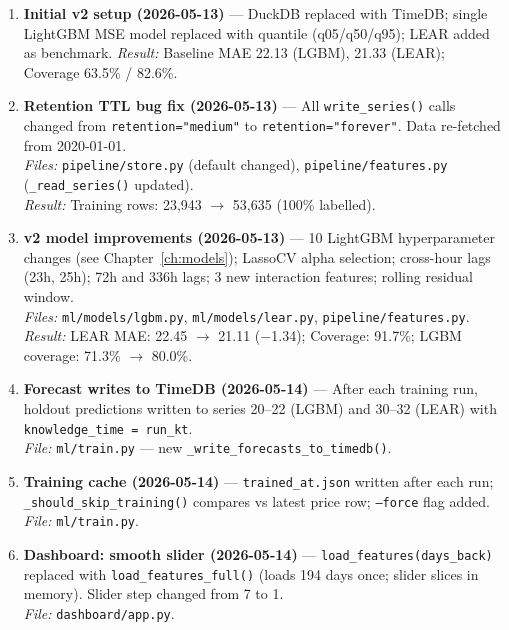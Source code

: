 \documentclass[12pt, a4paper, oneside]{memoir}
\newcommand{\code}[1]{\texttt{\footnotesize #1}}
\newcommand{\filepath}[1]{\textcolor{se3blue}{\texttt{\footnotesize #1}}}
\begin{document}
\begin{enumerate}[leftmargin=*, label=\textbf{Change \arabic*.}]

\item \textbf{Initial v2 setup (2026-05-13)} --- DuckDB replaced with TimeDB; single
  LightGBM MSE model replaced with quantile (q05/q50/q95); LEAR added as benchmark.
  \textit{Result:} Baseline MAE 22.13 (LGBM), 21.33 (LEAR); Coverage 63.5\% / 82.6\%.

\item \textbf{Retention TTL bug fix (2026-05-13)} --- All \code{write\_series()} calls
  changed from \code{retention="medium"} to \code{retention="forever"}. Data re-fetched
  from 2020-01-01.\\
  \textit{Files:} \filepath{pipeline/store.py} (default changed), \filepath{pipeline/features.py}
  (\code{\_read\_series()} updated).\\
  \textit{Result:} Training rows: 23,943 $\rightarrow$ 53,635 (100\% labelled).

\item \textbf{v2 model improvements (2026-05-13)} --- 10 LightGBM hyperparameter
  changes (see Chapter~\ref{ch:models}); LassoCV alpha selection; cross-hour lags
  (23h, 25h); 72h and 336h lags; 3 new interaction features; rolling residual window.\\
  \textit{Files:} \filepath{ml/models/lgbm.py}, \filepath{ml/models/lear.py},
  \filepath{pipeline/features.py}.\\
  \textit{Result:} LEAR MAE: 22.45 $\rightarrow$ 21.11 ($-$1.34); Coverage: 91.7\%;
  LGBM coverage: 71.3\% $\rightarrow$ 80.0\%.

\item \textbf{Forecast writes to TimeDB (2026-05-14)} --- After each training run,
  holdout predictions written to series 20--22 (LGBM) and 30--32 (LEAR) with
  \code{knowledge\_time = run\_kt}.\\
  \textit{File:} \filepath{ml/train.py} --- new \code{\_write\_forecasts\_to\_timedb()}.

\item \textbf{Training cache (2026-05-14)} --- \code{trained\_at.json} written after
  each run; \code{\_should\_skip\_training()} compares vs latest price row; \code{--force}
  flag added.\\
  \textit{File:} \filepath{ml/train.py}.

\item \textbf{Dashboard: smooth slider (2026-05-14)} --- \code{load\_features(days\_back)}
  replaced with \code{load\_features\_full()} (loads 194 days once; slider slices in
  memory). Slider step changed from 7 to 1.\\
  \textit{File:} \filepath{dashboard/app.py}.


\end{enumerate}
\end{document}
